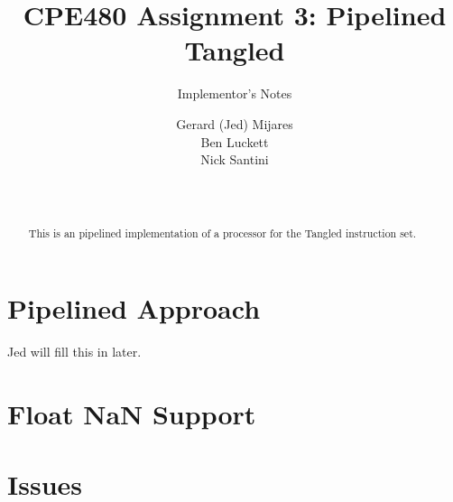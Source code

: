 \documentclass{sig-alternate-05-2015}
\begin{document}

\title{CPE480 Assignment 3: Pipelined Tangled }
\subtitle{Implementor's Notes}

\author{
Gerard (Jed) Mijares\\
Ben Luckett\\
Nick Santini\\
       \\
       \\
}

\maketitle
\begin{abstract}
This is an pipelined implementation of a processor for the Tangled instruction set. 
\end{abstract}

\section{Pipelined Approach}

Jed will fill this in later.


\section{Float NaN Support}

\section{Issues}
\end{document}
